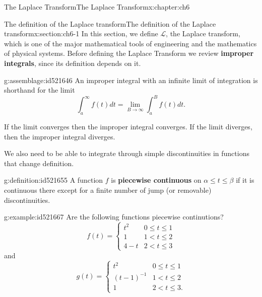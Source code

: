 \documentclass[oneside,10pt,]{book}
\newcommand{\terminology}[1]{\textbf{#1}}
\numberwithin{equation}{section}
\numberwithin{equation}{section}
\newcommand{\lt}{<}
\newcommand{\amp}{&}
\begin{document}
\begin{chapterptx}{The Laplace Transform}{}{The Laplace Transform}{}{}{x:chapter:ch6}
%
%
\typeout{************************************************}
\typeout{************************************************}
%
\begin{sectionptx}{The definition of the Laplace transform}{}{The definition of the Laplace transform}{}{}{x:section:ch6-1}
In this section, we define \(\mathcal{L}\), the Laplace transform, which is one of the major mathematical tools of engineering and the mathematics of physical systems. Before defining the Laplace Transform we review \terminology{improper integrals},         since its definition depends on it.%
\begin{assemblage}{}{g:assemblage:id521646}%
An improper integral with an infinite limit of integration is shorthand for the limit%
\begin{equation*}
\int_{a}^{\infty}f(t)dt=\lim_{B\to\infty}\int_{a}^{B}f(t)dt.
\end{equation*}
%
\end{assemblage}
If the limit converges then the improper integral converges. If the limit diverges, then the improper integral diverges.%
\par
We also need to be able to integrate through simple discontinuities in functions that change definition.%
\begin{definition}{}{g:definition:id521655}%
A function \(f\) is \terminology{piecewise continuous} on \(\alpha\leq t\leq\beta\) if it is continuous there except for a finite number of jump (or removable) discontinuities.%
\end{definition}
\begin{example}{}{g:example:id521667}%
Are the following functions piecewise continutions?%
\begin{equation*}
f(t)=\begin{cases}
t^{2} \amp 0\leq t\leq1\\
1 \amp 1\lt t\leq2\\
4-t \amp 2\lt t\leq3
\end{cases}
\end{equation*}
and%
\begin{equation*}
g(t)=\begin{cases}
t^{2} \amp 0\leq t\leq1\\
(t-1)^{-1} \amp 1\lt t\leq2\\
1 \amp 2\lt t\leq3.
\end{cases}

\end{equation*}
\end{example}
\end{sectionptx}
\end{chapterptx}
\end{document}
